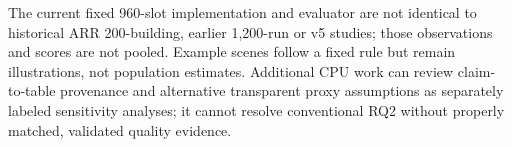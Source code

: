 The current fixed 960-slot implementation and evaluator are not identical to historical ARR 200-building, earlier 1,200-run or v5 studies; those observations and scores are not pooled. Example scenes follow a fixed rule but remain illustrations, not population estimates. Additional CPU work can review claim-to-table provenance and alternative transparent proxy assumptions as separately labeled sensitivity analyses; it cannot resolve conventional RQ2 without properly matched, validated quality evidence.
